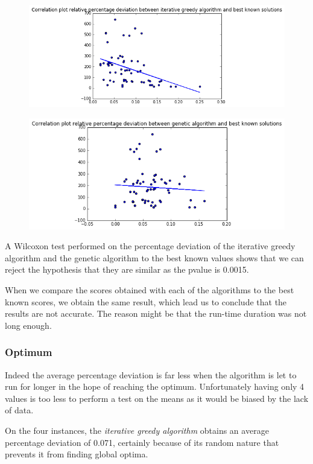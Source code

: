 \documentclass[a4paper,12pt]{article}
\begin{document}
\begin{figure}[p]
   \includegraphics[width=\textwidth]{ig.png}
\end{figure}

\begin{figure}[p]
   \includegraphics[width=\textwidth]{gen.png}
\end{figure}

A Wilcoxon test performed on the percentage deviation of the iterative greedy algorithm and the genetic algorithm to the best known values shows that we can reject the hypothesis that they are similar as the pvalue is 0.0015. 

When we compare the scores obtained with each of the algorithms to the best known scores, we obtain the same result, which lead us to conclude that the results are not accurate. The reason might be that the run-time duration was not long enough.


\subsubsection{Optimum}

Indeed the average percentage deviation is far less when the algorithm is let to run for longer in the hope of reaching the optimum. Unfortunately having only 4 values is too less to perform a test on the means as it would be biased by the lack of data.

On the four instances, the \textit{iterative greedy algorithm} obtains an average percentage deviation of 0.071, certainly because of its random nature that prevents it from finding global optima. 
\end{document}

